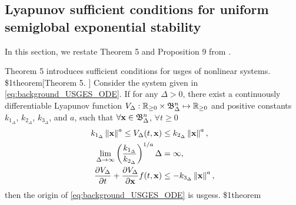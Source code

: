 \subsection{Lyapunov sufficient conditions for uniform semiglobal exponential stability}
In this section, we restate Theorem 5 and Proposition 9 from \cite{pettersen_lyapunov_2017}.

Theorem 5 introduces sufficient conditions for \acrfull{usges} of nonlinear systems.
\$1{theorem}[Theorem 5. \cite{pettersen_lyapunov_2017}]
    \label{thm:background_USGES}
    Consider the system given in \eqref{eq:background_USGES_ODE}.
    If for any $\Delta > 0$, there exist a continuously differentiable Lyapunov function $V_{\Delta} : \mathbb{R}_{\geq 0} \times \mathfrak{B}_{\Delta}^{n} \mapsto \mathbb{R}_{\geq 0}$ and positive constants $k_{1_\Delta}$, $k_{2_\Delta}$, $k_{3_\Delta}$, and $a$, such that $\forall \mathbf{x} \in \mathfrak{B}_{\Delta}^{n}$, $\forall t \geq 0$
    \begin{subequations}
        \begin{align}
            k_{1_\Delta} \left\|\mathbf{x}\right\|^a \leq V_{\Delta}(t, \mathbf{x}) &\leq k_{2_\Delta} \left\|\mathbf{x}\right\|^a, \\
            \lim_{\Delta \rightarrow \infty} \left(\frac{k_{1_\Delta}}{k_{2_\Delta}}\right)^{1/a} \Delta &= \infty, \\
            \frac{\partial V_{\Delta}}{\partial t} + \frac{\partial V_{\Delta}}{\partial \mathbf{x}} f(t, \mathbf{x}) &\leq -k_{3_\Delta} \left\|\mathbf{x}\right\|^a,
        \end{align}
    \end{subequations}
    then the origin of \eqref{eq:background_USGES_ODE} is \glspl{usges}.
\$1{theorem}

